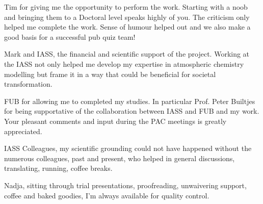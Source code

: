 Tim for giving me the opportunity to perform the work. Starting with a noob and bringing them to a Doctoral level speaks highly of you. The criticism only helped me complete the work. Sense of humour helped out and we also make a good basis for a successful pub quiz team!

Mark and IASS, the financial and scientific support of the project. Working at the IASS not only helped me develop my expertise in atmospheric chemistry modelling but frame it in a way that could be beneficial for societal transformation.

FUB for allowing me to completed my studies. In particular Prof. Peter Builtjes for being supportative of the collaboration between IASS and FUB and my work. Your pleasant comments and input during the PAC meetings is greatly appreciated.

IASS Colleagues, my scientific grounding could not have happened without the numerous colleagues, past and present, who helped in general discussions, translating, running, coffee breaks.

Nadja, sitting through trial presentations, proofreading, unwaivering support, coffee and baked goodies, I'm always available for quality control.
